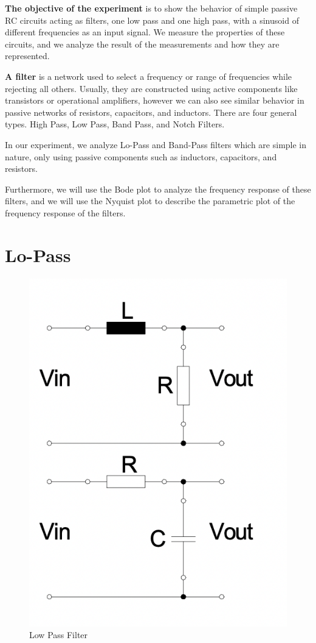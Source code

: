 \textbf{The objective of the experiment} is to show the behavior of simple passive
RC circuits acting as filters, one low pass and one high pass, with a sinusoid of different frequencies as an input signal.
We measure the properties of these circuits, and we analyze the
result of the measurements and how they are represented.


\textbf{A filter} is a network used to select a frequency or range of frequencies while rejecting all others. Usually, they are constructed using active components like transistors or operational amplifiers, however we can also see similar behavior in passive networks of resistors,
capacitors, and inductors. There are four general types. High Pass, Low Pass, Band Pass, and Notch Filters.


In our experiment, we analyze Lo-Pass and Band-Pass filters which are simple in nature, only using passive components such as inductors, capacitors, and resistors.


Furthermore, we will use the Bode plot to analyze the frequency response of these filters, and we will use the Nyquist plot to describe the parametric plot of the frequency response of the filters.

\section{Lo-Pass}
\begin{figure}[H]
    \centering
    \includegraphics{images/figure_low_pass.png}
    \caption{Low Pass Filter}
\end{figure}


